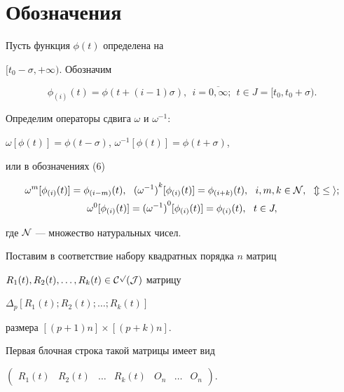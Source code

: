 \section{Обозначения}





Пусть функция $\phi (t)$ определена на


$[t_0-\sigma, +\infty)$. Обозначим


\begin{equation}


\phi_{(i)}(t)=\phi (t+(i-1)\sigma ), \ \ i= \overline{0,\infty};\ \ 


t \in J=[t_0,t_0+\sigma).


\end{equation}


Определим операторы сдвига $\omega$ и $\omega^{-1}$:


$\omega[\phi(t)]=\phi(t-\sigma)$, $\omega^{-1}[\phi(t)]=\phi(t+\sigma)$,


или в обозначениях (6)


\begin{gather*}


\omega^m[\phi_{(i)}(t)]=\phi_{(i-m)}(t), \ \


{(\omega^{-1})}^k [\phi_{(i)}(t)]=\phi_{(i+k)}(t), \ \ i,m,k \in \cal N,\ \


m\le i;\\


%


\omega^0[\phi_{(i)}(t)]={(\omega^{-1})}^{0}[\phi_{(i)}(t) ] =\phi_{(i)}


(t),\ \ t \in J,


\end{gather*}


где $\cal N$ --- множество натуральных чисел.





Поставим в соответствие набору квадратных порядка $n$ матриц


$R_1(t), R_2(t), \dotsc,R_k(t) \in \cal C^p(J)$ матрицу


$\Delta_p [R_1(t);R_2(t); \dotsc; R_k(t)]$


размера $[(p+1)n] \times[(p+k)n]$.


Первая блочная строка такой матрицы имеет вид


$\begin{pmatrix}


R_1(t) & R_2(t) & \dotsc & R_k(t) & O_n & \dotsc & O_n


\end{pmatrix}$.


